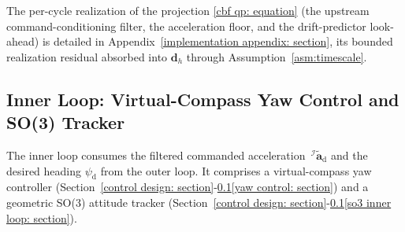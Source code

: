 \documentclass{IEEEtaes}
\theoremstyle{definition}
\theoremstyle{remark}
\begin{document}
The per-cycle realization of the projection \eqref{cbf qp: equation} (the upstream command-conditioning filter, the acceleration floor, and the drift-predictor look-ahead) is detailed in Appendix~\ref{implementation appendix: section}, its bounded realization residual absorbed into $\boldsymbol{d}_h$ through Assumption~\ref{asm:timescale}.

\subsection{Inner Loop: Virtual-Compass Yaw Control and SO(3) Tracker} \label{inner loop: section}
The inner loop consumes the filtered commanded acceleration $\,^\mathcal{I}\tilde{\boldsymbol{a}}_\text{d}$ and the desired heading $\psi_\text{d}$ from the outer loop. It comprises a virtual-compass yaw controller (Section~\ref{control design: section}-\ref{inner loop: section}\ref{yaw control: section}) and a geometric SO(3) attitude tracker (Section~\ref{control design: section}-\ref{inner loop: section}\ref{so3 inner loop: section}).
\end{document}
